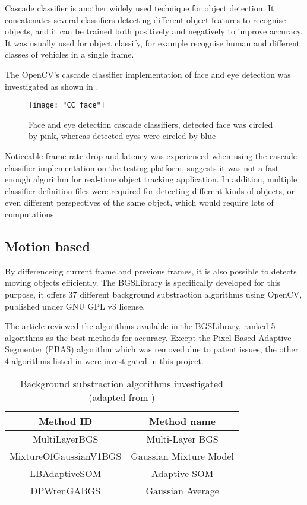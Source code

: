 Cascade classifier \cite{cascade} is another widely used technique for object detection. It concatenates several classifiers detecting different object features to recognise objects, and it can be trained both positively and negatively to improve accuracy. It was usually used for object classify, for example recognise human and different classes of vehicles in a single frame.

The OpenCV's cascade classifier implementation \cite{opencv:cc} of face and eye detection was investigated as shown in .

\begin{figure}[H]
  \centering
  \texttt{[image: "CC face"]}
  \caption{Face and eye detection cascade classifiers, detected face was circled by pink, whereas detected eyes were circled by blue}
  \label{Figure:cc_face}
\end{figure}

Noticeable frame rate drop and latency was experienced when using the cascade classifier implementation on the testing platform, suggests it was not a fast enough algorithm for real-time object tracking application. In addition, multiple classifier definition files were required for detecting different kinds of objects, or even different perspectives of the same object, which would require lots of computations.

\subsection{Motion based}

By differenceing current frame and previous frames, it is also possible to detects moving objects efficiently. The BGSLibrary \cite{bgslibrary} is specifically developed for this purpose, it offers 37 different background substraction algorithms using OpenCV, published under GNU GPL v3 license.

The article \cite{bgs:article} reviewed the algorithms available in the BGSLibrary, ranked 5 algorithms as the best methods for accuracy. Except the Pixel-Based Adaptive Segmenter (PBAS) algorithm which was removed due to patent issues, the other 4 algorithms listed in  were investigated in this project.

\begin{table}[H]
  \centering
  \begin{tabular}{cc}
  \toprule
  \textbf{Method ID} & \textbf{Method name}\\
  \midrule
  MultiLayerBGS & Multi-Layer BGS \\
  MixtureOfGaussianV1BGS & Gaussian Mixture Model \\
  LBAdaptiveSOM & Adaptive SOM \\
  DPWrenGABGS & Gaussian Average \\
  \bottomrule
  \end{tabular}
  \caption{Background substraction algorithms investigated (adapted from \cite{bgslibrary})}
  \label{Table:bgs}
\end{table}

